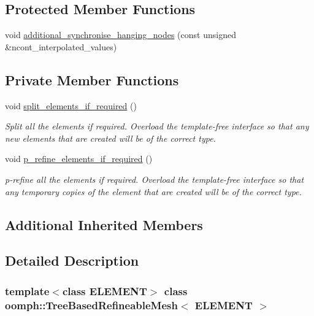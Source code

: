 \subsection*{Protected Member Functions}
\begin{DoxyCompactItemize}
\item 
void \hyperlink{classoomph_1_1TreeBasedRefineableMesh_a1af8d6a53048bd0d376f6a56bbd4c125}{additional\+\_\+synchronise\+\_\+hanging\+\_\+nodes} (const unsigned \&ncont\+\_\+interpolated\+\_\+values)
\end{DoxyCompactItemize}
\subsection*{Private Member Functions}
\begin{DoxyCompactItemize}
\item 
void \hyperlink{classoomph_1_1TreeBasedRefineableMesh_a43f134cb974f25f25d5ddfa88d56ef95}{split\+\_\+elements\+\_\+if\+\_\+required} ()
\begin{DoxyCompactList}\small\item\em Split all the elements if required. Overload the template-\/free interface so that any new elements that are created will be of the correct type. \end{DoxyCompactList}\item 
void \hyperlink{classoomph_1_1TreeBasedRefineableMesh_aa47363e7700089d4b8756b2339c4893c}{p\+\_\+refine\+\_\+elements\+\_\+if\+\_\+required} ()
\begin{DoxyCompactList}\small\item\em p-\/refine all the elements if required. Overload the template-\/free interface so that any temporary copies of the element that are created will be of the correct type. \end{DoxyCompactList}\end{DoxyCompactItemize}
\subsection*{Additional Inherited Members}


\subsection{Detailed Description}
\subsubsection*{template$<$class E\+L\+E\+M\+E\+NT$>$\newline
class oomph\+::\+Tree\+Based\+Refineable\+Mesh$<$ E\+L\+E\+M\+E\+N\+T $>$}

